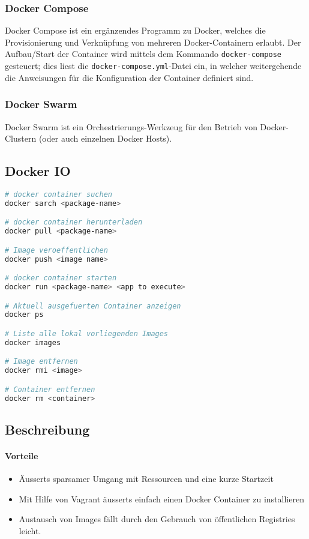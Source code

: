 \subsubsection{Docker Compose}

Docker Compose ist ein ergänzendes Programm zu Docker, welches die Provisionierung und Verknüpfung von mehreren Docker-Containern erlaubt. Der Aufbau/Start der Container wird mittels dem Kommando \lstinline|docker-compose| gesteuert; dies liest die \lstinline|docker-compose.yml|-Datei ein, in welcher weitergehende die Anweisungen für die Konfiguration der Container definiert sind.

\subsubsection{Docker Swarm}
Docker Swarm ist ein Orchestrierungs-Werkzeug für den Betrieb von Docker-Clustern (oder auch einzelnen Docker Hosts).



\subsection{Docker IO}
\begin{lstlisting}[language=bash]
# docker container suchen
docker sarch <package-name>

# docker container herunterladen
docker pull <package-name>

# Image veroeffentlichen
docker push <image name>

# docker container starten
docker run <package-name> <app to execute>

# Aktuell ausgefuerten Container anzeigen
docker ps

# Liste alle lokal vorliegenden Images
docker images

# Image entfernen
docker rmi <image>

# Container entfernen
docker rm <container>
\end{lstlisting}


\subsection{Beschreibung}
\paragraph{Vorteile}
\begin{itemize}
	\item Äusserts sparsamer Umgang mit Ressourcen und eine kurze Startzeit	
	\item Mit Hilfe von Vagrant äusserts einfach einen Docker Container zu installieren
	\item Austausch von Images fällt durch den Gebrauch von öffentlichen Registries leicht.
\end{itemize}

